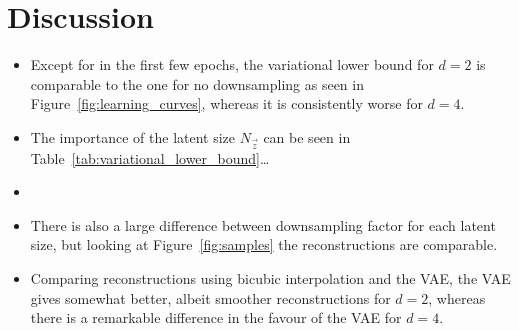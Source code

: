 \section{Discussion}
\label{sec:discussion}

\begin{itemize}
	\item Except for in the first few epochs, the variational lower bound for $d = 2$ is comparable to the one for no downsampling as seen in Figure~\ref{fig:learning_curves}, whereas it is consistently worse for $d = 4$.
	\item The importance of the latent size $N_{\vec{z}}$ can be seen in Table~\ref{tab:variational_lower_bound}\dots
	\item {}
	\item There is also a large difference between downsampling factor for each latent size, but looking at Figure~\ref{fig:samples} the reconstructions are comparable.
	\item Comparing reconstructions using bicubic interpolation and the VAE, the VAE gives somewhat better, albeit smoother reconstructions for $d = 2$, whereas there is a remarkable difference in the favour of the VAE for $d = 4$.
\end{itemize}

